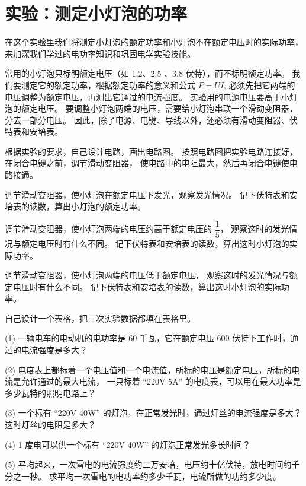 \section{实验：测定小灯泡的功率}\label{sec:9-3}

在这个实验里我们将测定小灯泡的额定功率和小灯泡不在额定电压时的实际功率，
来加深我们学过的电功率知识和巩固电学实验技能。

常用的小灯泡只标明额定电压（如 1.2、2.5 、3.8 伏特），而不标明额定功率。
我们要测定它的额定功率，根据额定功率的意义和公式 $P = UI$,
必须先把它两端的电压调整为额定电压，再测出它通过的电流强度。
实验用的电源电压要高于小灯泡的额定电压。
要调整小灯泡两端的电压，需要给小灯泡串联一个滑动变阻器，分去一部分电压。
因此，除了电源、电键、导线以外，还必须有滑动变阻器、伏特表和安培表。

根据实验的要求，自己设计电路，画出电路图。
按照电路图把实验电路连接好，在闭合电键之前，调节滑动变阻器，
使电路中的电阻最大，然后再闭合电键使电路接通。

调节滑动变阻器，使小灯泡在额定电压下发光，观察发光情况。
记下伏特表和安培表的读数，算出小灯泡的额定功率。

\begin{enhancedline}
调节滑动变阻器，使小灯泡两端的电压约高于额定电压的 $\dfrac{1}{5}$，
观察这时的发光情况与额定电压时有什么不同。
记下伏特表和安培表的读数，算出这时小灯泡的实际功率。
\end{enhancedline}

调节滑动变阻器，使小灯泡两端的电压低于额定电压，
观察这时的发光情况与额定电压时有什么不同。
记下伏特表和安培表的读数，算出这时小灯泡的实际功率。

自己设计一个表格，把三次实验数据都填在表格里。



\lianxi

(1) 一辆电车的电动机的电功率是 60 千瓦，它在额定电压 600 伏特下工作时，通过的电流强度是多大？

(2) 电度表上都标着一个电压值和一个电流值，所标的电压是额定电压，所标的电流是允许通过的最大电流，
一只标着 “220V \; 5A” 的电度表，可以用在最大功率是多少瓦特的照明电路上？

(3) 一个标有 “220V \; 40W” 的灯泡，在正常发光时，通过灯丝的电流强度是多大？这时灯丝的电阻是多大？

(4) 1 度电可以供一个标有 “220V \; 40W” 的灯泡正常发光多长时间？

(5) 平均起来，一次雷电的电流强度约二万安培，电压约十亿伏特，放电时间约千分之一秒。
求平均一次雷电的电功率约多少千瓦，电流所做的功约多少度。

